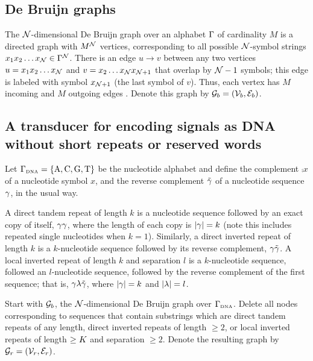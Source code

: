 \documentclass[english]{article}
\begin{document}
\subsection*{De Bruijn graphs}

The ${\cal N}$-dimensional De Bruijn graph over an alphabet $\Gamma$ of cardinality $M$
is a directed graph with $M^{\cal N}$ vertices,
corresponding to all possible ${\cal N}$-symbol strings
$x_1 x_2 \ldots x_{\cal N} \in \Gamma^{\cal N}$.
There is an edge $u \to v$ between any two vertices
$u=x_1 x_2 \ldots x_{\cal N}$ and $v=x_2 \ldots x_{\cal N} x_{{\cal N}+1}$
that overlap by ${\cal N}-1$ symbols; this edge is labeled with symbol $x_{{\cal N}+1}$ (the last symbol of $v$).
Thus, each vertex has $M$ incoming and $M$ outgoing edges \cite{DeBruijn1946,PevznerEtAl2001}.
Denote this graph by ${\cal G}_b = ({\cal V}_b,{\cal E}_b)$.

\subsection*{A transducer for encoding signals as DNA without short repeats or reserved words}

Let $\Gamma_{\mbox{\tiny DNA}} = \{ \mbox{A}, \mbox{C}, \mbox{G}, \mbox{T} \} $ be the nucleotide alphabet and define the complement $\comp{x}$ of a nucleotide symbol $x$,
and the reverse complement $\tilde{\gamma}$ of a nucleotide sequence $\gamma$, in the usual way.

A direct tandem repeat of length $k$ is a nucleotide sequence followed by an exact copy of itself, $\gamma \gamma$, where the length of each copy is $|\gamma|=k$
(note this includes repeated single nucleotides when $k=1$).
Similarly, a direct inverted repeat of length $k$ is a $k$-nucleotide sequence followed by its reverse complement, $\gamma \tilde{\gamma}$.
A local inverted repeat of length $k$ and separation $l$ is a $k$-nucleotide sequence, followed an $l$-nucleotide sequence, followed by the reverse complement
of the first sequence; that is, $\gamma \lambda \tilde{\gamma}$, where $|\gamma|=k$ and $|\lambda|=l$.

Start with ${\cal G}_b$, the ${\cal N}$-dimensional De Bruijn graph over $\Gamma_{\mbox{\tiny DNA}}$.
Delete all nodes corresponding to sequences that contain substrings which are
direct tandem repeats of any length,
direct inverted repeats of length $\geq 2$,
or local inverted repeats of length $\geq K$ and separation $\geq 2$.
Denote the resulting graph by ${\cal G}_r = ({\cal V}_r,{\cal E}_r)$.
\end{document}
